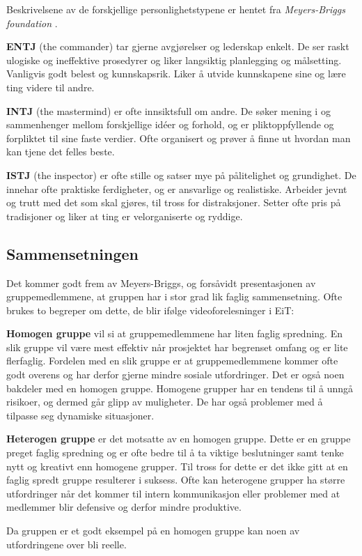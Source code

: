 Beskrivelsene av de forskjellige personlighetstypene er hentet fra \textit{Meyers-Briggs foundation} \citep{mbtypes}.
\vspace{\secspace}

\textbf{ENTJ} (the commander) tar gjerne avgjørelser og lederskap enkelt. 
De ser raskt ulogiske og ineffektive prosedyrer og liker langsiktig planlegging og målsetting. 
Vanligvis godt belest og kunnskapsrik. 
Liker å utvide kunnskapene sine og lære ting videre til andre. 
\vspace{\secspace}

\textbf{INTJ} (the mastermind) er ofte innsiktsfull om andre. 
De søker mening i og sammenhenger mellom forskjellige idéer og forhold, og er pliktoppfyllende og forpliktet til sine faste verdier. 
Ofte organisert og prøver å finne ut hvordan man kan tjene det felles beste. 

\textbf{ISTJ} (the inspector) er ofte stille og satser mye på pålitelighet og grundighet. 
De innehar ofte praktiske ferdigheter, og er ansvarlige og realistiske. 
Arbeider jevnt og trutt med det som skal gjøres, til tross for distraksjoner. 
Setter ofte pris på tradisjoner og liker at ting er velorganiserte og ryddige. 

\subsection{Sammensetningen}
Det kommer godt frem av Meyers-Briggs, og forsåvidt presentasjonen av gruppemedlemmene, at gruppen har i stor grad lik faglig sammensetning.
Ofte brukes to begreper om dette, de blir ifølge videoforelesninger\citep{video} i EiT: 
\vspace{\secspace}

\textbf{Homogen gruppe} vil si at gruppemedlemmene har liten faglig spredning. 
En slik gruppe vil være mest effektiv når prosjektet har begrenset omfang og er lite flerfaglig. 
Fordelen med en slik gruppe er at gruppemedlemmene kommer ofte godt overens og har derfor gjerne mindre sosiale utfordringer. 
Det er også noen bakdeler med en homogen gruppe. 
Homogene grupper har en tendens til å unngå risikoer, og dermed går glipp av muligheter. 
De har også problemer med å tilpasse seg dynamiske situasjoner.
\vspace{\secspace}

\textbf{Heterogen gruppe} er det motsatte av en homogen gruppe. 
Dette er en gruppe preget faglig spredning og er ofte bedre til å ta viktige beslutninger samt tenke nytt og kreativt enn homogene grupper. 
Til tross for dette er det ikke gitt at en faglig spredt gruppe resulterer i suksess. 
Ofte kan heterogene grupper ha større utfordringer når det kommer til intern kommunikasjon eller problemer med at medlemmer blir defensive og derfor mindre produktive. 
\vspace{\secspace}

Da gruppen er et godt eksempel på en homogen gruppe kan noen av utfordringene over bli reelle.
